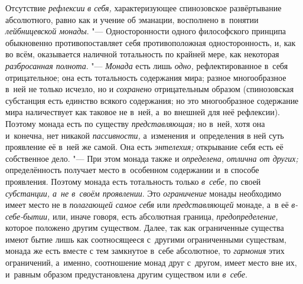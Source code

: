 Отсутствие {\em рефлексии} {\em в
себя,} характеризующее спинозовское развёртывание абсолютного, равно как и
учение об эманации, восполнено в~понятии
{\em лейбницевской монады}. "--- Односторонности одного
философского принципа обыкновенно противопоставляет себя противоположная
односторонность, и, как во всём, оказывается наличной тотальность по
крайней мере, как некоторая {\em разбросанная
полнота}. "--- {\em Монада} есть лишь
{\em одно,} рефлектированное в~себя отрицательное; она
есть тотальность содержания мира; разное многообразное в~ней не только
исчезло, но и {\em сохранено} отрицательным образом
(спинозовская субстанция есть единство всякого содержания; но это
многообразное содержание мира наличествует как таковое не в~ней, а~во
внешней для неё рефлексии). Поэтому монада есть по существу
{\em представляющая;} но в~ней, хотя она и~конечна, нет
никакой {\em пассивности,} а~изменения и~определения в
ней суть проявление её в~ней же самой. Она есть
{\em энтелехия;} открывание себя есть её собственное
дело. "--- При этом монада также и {\em определена,}
{\em отлична от других;} определённость получает место
в~особенном содержании и~в способе проявления. Поэтому монада есть
тотальность только {\em в~себе,} по своей
{\em субстанции, а~не в~своём проявлении}. Это
{\em ограничение} монады необходимо имеет место не в
{\em полагающей самое себя} или
{\em представляющей} монаде, а~в её
{\em в-себе-бытии,} или, иначе говоря, есть абсолютная
граница, {\em предопределение,} которое положено
другим существом. Далее, так как ограниченные существа имеют бытие лишь как
соотносящееся с~другими ограниченными существам, монада же есть вместе с
тем замкнутое в~себе абсолютное, то {\em гармония} этих
ограничений, а~именно, соотношение монад друг с~другом, имеет место вне их,
и~равным образом предустановлена другим существом или
{\em в~себе}.

